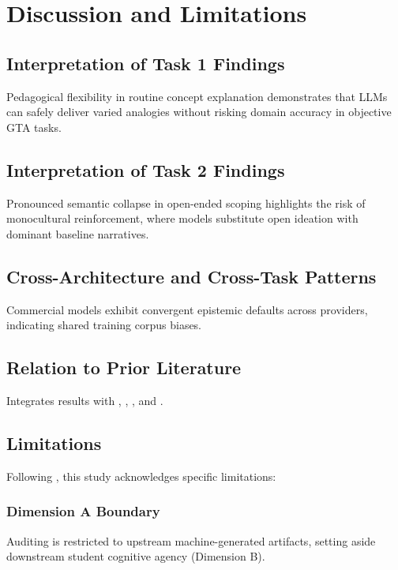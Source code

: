 
\chapter{Discussion and Limitations}
\section{Interpretation of Task 1 Findings}
Pedagogical flexibility in routine concept explanation demonstrates that LLMs can safely deliver varied analogies without risking domain accuracy in objective GTA tasks.

\section{Interpretation of Task 2 Findings}
Pronounced semantic collapse in open-ended scoping highlights the risk of monocultural reinforcement, where models substitute open ideation with dominant baseline narratives.

\section{Cross-Architecture and Cross-Task Patterns}
Commercial models exhibit convergent epistemic defaults across providers, indicating shared training corpus biases.

\section{Relation to Prior Literature}
Integrates results with \cite{Ashkinaze2025}, \cite{Bender2021}, \cite{Warren2020}, and \cite{Santos2014}.

\section{Limitations}
Following \cite[Section 6.4]{Ashkinaze2025}, this study acknowledges specific limitations:
\subsection{Dimension A Boundary}
Auditing is restricted to upstream machine-generated artifacts, setting aside downstream student cognitive agency (Dimension B).

